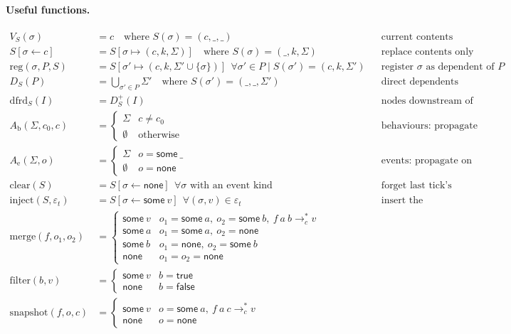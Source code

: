 \documentclass{article}
\newcommand{\kw}[1]{\mathsf{#1}}
\newcommand{\none}{\kw{none}}
\newcommand{\some}[1]{\kw{some}\ #1}
\newcommand{\cstar}{\mathrel{\longrightarrow_{c}^{*}}}
\newcommand{\dfrd}{\mathrm{dfrd}}
\begin{document}
\paragraph{Useful functions.}
\begin{align*}
V_S(\sigma) &= c \quad\text{where } S(\sigma) = (c,\_,\_) && \text{current contents}\\
S[\sigma \leftarrow c] &= S[\sigma \mapsto (c,k,\Sigma)] \quad\text{where } S(\sigma) = (\_,k,\Sigma) && \text{replace contents only}\\
\mathrm{reg}(\sigma,P,S) &= S[\sigma' \mapsto (c,k,\Sigma' \cup \{\sigma\})]\ \ \forall \sigma' \in P \mid S(\sigma') = (c,k,\Sigma') && \text{register $\sigma$ as dependent of $P$}\\
D_S(P) &= \textstyle\bigcup_{\sigma' \in P} \Sigma' \quad\text{where } S(\sigma') = (\_,\_,\Sigma') && \text{direct dependents}\\
\dfrd_S(I) &= D_S^{+}(I) && \text{nodes downstream of a dirty node}\\
A_{\mathrm{b}}(\Sigma,c_0,c) &= \begin{cases}\Sigma & c \neq c_0\\ \emptyset & \text{otherwise}\end{cases} && \text{behaviours: propagate on change}\\
A_{\mathrm{e}}(\Sigma,o) &= \begin{cases}\Sigma & o = \some{\_}\\ \emptyset & o = \none\end{cases} && \text{events: propagate on presence}\\
\mathrm{clear}(S) &= S[\sigma \leftarrow \none]\ \ \forall \sigma \text{ with an event kind} && \text{forget last tick's occurrences}\\
\mathrm{inject}(S,\varepsilon_t) &= S[\sigma \leftarrow \some{v}]\ \ \forall (\sigma,v) \in \varepsilon_t && \text{insert the environment's occurrences}\\
\mathrm{merge}(f,o_1,o_2) &= \begin{cases}\some{v} & o_1 = \some{a},\ o_2 = \some{b},\ f\ a\ b \cstar v\\ \some{a} & o_1 = \some{a},\ o_2 = \none\\ \some{b} & o_1 = \none,\ o_2 = \some{b}\\ \none & o_1 = o_2 = \none\end{cases}\\
\mathrm{filter}(b,v) &= \begin{cases}\some{v} & b = \kw{true}\\ \none & b = \kw{false}\end{cases}\\
\mathrm{snapshot}(f,o,c) &= \begin{cases}\some{v} & o = \some{a},\ f\ a\ c \cstar v\\ \none & o = \none\end{cases}
\end{align*}
\end{document}
